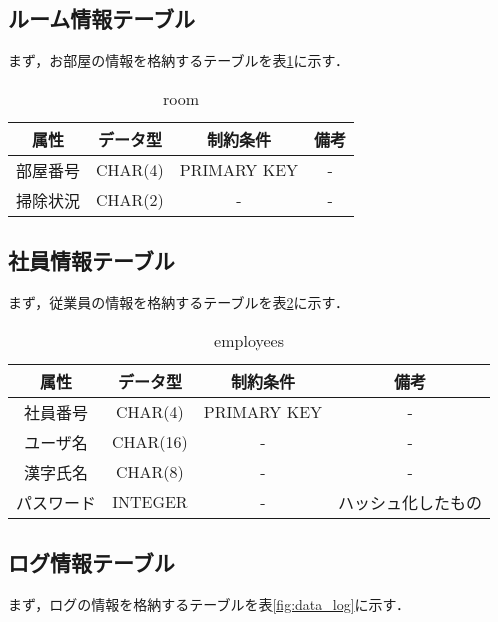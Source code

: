     \subsection{ルーム情報テーブル}
まず，お部屋の情報を格納するテーブルを表\ref{fig:data_room}に示す．

 \begin{table}
\begin{center}
\begin{tabular}{|c|c|c|c|}
\hline
    属性       & データ型      &  制約条件     & 備考 \\ \hline \hline
    部屋番号     & CHAR(4)       & PRIMARY KEY  &  - \\ \hline
    掃除状況     & CHAR(2)          &   -          &   - \\ \hline
    \end{tabular}
    \label{fig:data_room} 
    \caption{room}
\end{center}
\end{table}
 
\subsection{社員情報テーブル}
まず，従業員の情報を格納するテーブルを表\ref{fig:data_emp}に示す．
\begin{table}
\begin{center}
\begin{tabular}{|c|c|c|c|}
\hline
    属性       & データ型      &  制約条件     & 備考 \\ \hline \hline
    社員番号   & CHAR(4)       & PRIMARY KEY  &  - \\ \hline
    ユーザ名     & CHAR(16)         &   -          &   - \\ \hline
    漢字氏名     & CHAR(8)       &   -          &   - \\ \hline
    パスワード     & INTEGER       & -            &  ハッシュ化したもの \\ \hline 
    \end{tabular}
    \label{fig:data_emp} 
    \caption{employees}
\end{center}
\end{table}

\subsection{ログ情報テーブル}
まず，ログの情報を格納するテーブルを表\ref{fig:data_log}に示す．


